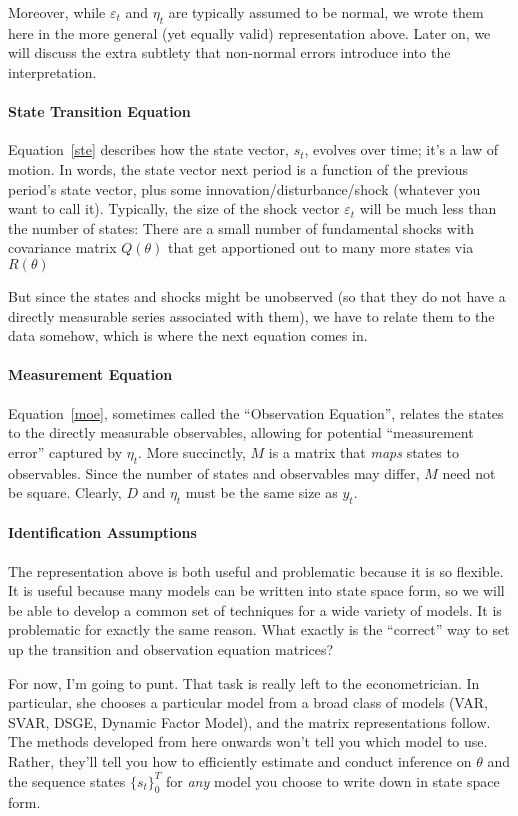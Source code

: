 \documentclass[a4paper,12pt]{article}
\begin{document}
Moreover, while $\varepsilon_t$ and $\eta_t$ are typically assumed to be
normal, we wrote them here in the more general (yet equally valid)
representation above. Later on, we will discuss the extra subtlety that
non-normal errors introduce into the interpretation.

\paragraph{State Transition Equation} Equation~\ref{ste} describes how
the state vector, $s_t$, evolves over time; it's a law of motion. In
words, the state vector next period is a function of the previous
period's state vector, plus some innovation/disturbance/shock (whatever
you want to call it).  Typically, the size of the shock vector
$\varepsilon_t$ will be much less than the number of states: There are a
small number of fundamental shocks with covariance matrix $Q(\theta)$
that get apportioned out to many more states via $R(\theta)$

But since the states and shocks might be unobserved (so that they do not
have a directly measurable series associated with them), we have to
relate them to the data somehow, which is where the next equation comes
in.

\paragraph{Measurement Equation} Equation~\ref{moe}, sometimes called
the ``Observation Equation'', relates the states to the directly
measurable observables, allowing for potential ``measurement error''
captured by $\eta_t$. More succinctly, $M$ is a matrix that \emph{maps}
states to observables. Since the number of states and observables may
differ, $M$ need not be square. Clearly, $D$ and $\eta_t$ must be the
same size as $y_t$.

\paragraph{Identification Assumptions}
The representation above is both useful and problematic because it is so
flexible.  It is useful because many models can be written into state
space form, so we will be able to develop a common set of techniques for
a wide variety of models. It is problematic for exactly the same reason.
What exactly is the ``correct'' way to set up the transition and
observation equation matrices?

For now, I'm going to punt. That task is really left to the
econometrician. In particular, she chooses a particular model from a
broad class of models (VAR, SVAR, DSGE, Dynamic Factor Model), and the
matrix representations follow. The methods developed from here onwards
won't tell you which model to use. Rather, they'll tell you how to
efficiently estimate and conduct inference on $\theta$ and the sequence
states $\{s_t\}_0^T$ for \emph{any} model you choose to write down in
state space form.
\end{document}
